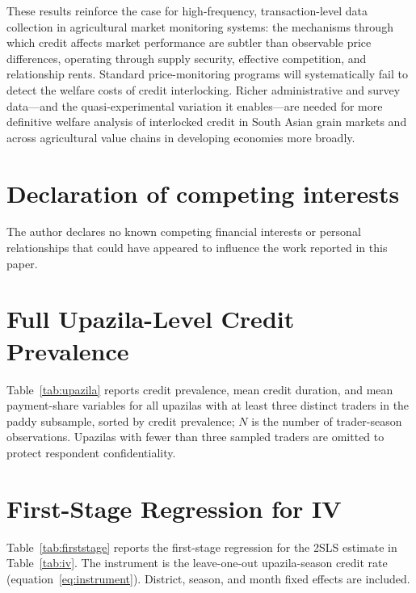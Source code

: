 \documentclass[authoryear,preprint,review,12pt]{elsarticle}
\begin{document}
These results reinforce the case for high-frequency, transaction-level
data collection in agricultural market monitoring systems: the mechanisms
through which credit affects market performance are subtler than observable
price differences, operating through supply security, effective competition,
and relationship rents. Standard price-monitoring programs will systematically
fail to detect the welfare costs of credit interlocking. Richer
administrative and survey data---and the quasi-experimental variation it
enables---are needed for more definitive welfare analysis of interlocked
credit in South Asian grain markets and across agricultural value chains
in developing economies more broadly.

\section*{Declaration of competing interests}

The author declares no known competing financial interests or personal
relationships that could have appeared to influence the work reported in
this paper.




\appendix

\section{Full Upazila-Level Credit Prevalence}
\label{app:upazila}

Table~\ref{tab:upazila} reports credit prevalence, mean credit duration,
and mean payment-share variables for all upazilas with at least three
distinct traders in the paddy subsample, sorted by credit prevalence; $N$ is
the number of trader-season observations. Upazilas with fewer than three
sampled traders are omitted to protect respondent confidentiality.



\section{First-Stage Regression for IV}
\label{app:firststage}

Table~\ref{tab:firststage} reports the first-stage regression for the 2SLS
estimate in Table~\ref{tab:iv}. The instrument is the leave-one-out
upazila-season credit rate (equation~\eqref{eq:instrument}). District,
season, and month fixed effects are included.
\end{document}
